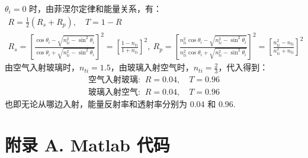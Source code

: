 \documentclass[UTF8]{report}
\theoremstyle{MyLineTheoremStyle} %
\theoremstyle{MyBlockTheoremStyle} %
\theoremstyle{MySubsubsectionStyle} %
\begin{document}
$\theta_i = 0$ 时，由菲涅尔定律和能量关系，有：
\begin{gather}
    R =  \frac{1}{2}(R_s + R_p),\quad  T = 1 - R\\ 
    R_s =  \left[ \frac{ \cos \theta_i - \sqrt{n_{ti}^2 - \sin^2 \theta_i} }{\cos \theta_i + \sqrt{n_{ti}^2 - \sin^2 \theta_i}} \right]^2 = \left[ \frac{1 - n_{ti}}{1 + n_{ti}} \right]^2,\ R_p = \left[ \frac{ n_{ti}^2\cos \theta_i - \sqrt{n_{ti}^2 - \sin^2 \theta_i} }{n_{ti}^2\cos \theta_i + \sqrt{n_{ti}^2 - \sin^2 \theta_i}} \right]^2 =  \left[ \frac{n_{ti}^2 - n_{ti}}{n_{ti}^2 + n_{ti}} \right]^2
\end{gather}
由空气入射玻璃时，$n_{ti} = 1.5$，由玻璃入射空气时，$n_{ti} = \frac{2}{3}$，代入得到：
\begin{gather*}
\text{空气入射玻璃: }\ R = 0.04,\quad  T = 0.96 \\ 
\text{玻璃入射空气: }\ R = 0.04,\quad  T = 0.96 
\end{gather*}
也即无论从哪边入射，能量反射率和透射率分别为 0.04 和 0.96.



\nocite{*}

\thispagestyle{fancy} 



\newpage
\appendix
\titleformat{\chapter}[hang]{\normalfont\huge\bfseries\centering}{}{20pt}{}
\titlespacing*{\chapter}{0pt}{-25pt}{8pt} %
\titleformat{\section}[hang]{\normalfont\centering\Large\bfseries}{\thesection}{8pt}{}

\chapter*{附录 A. Matlab 代码}   
\thispagestyle{fancy} 
\setcounter{section}{0}   
\renewcommand\thesection{A.\arabic{section}}   
\renewcommand{\thefigure}{A.\arabic{figure}} 
\renewcommand{\thetable}{A.\arabic{table}}
\end{document}
